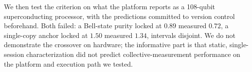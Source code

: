 %
%

We then test the criterion on what the platform reports as a 108-qubit
superconducting processor, with the predictions committed to version
control beforehand. Both failed: a Bell-state purity locked at \(0.89\)
measured \(0.72\), a single-copy anchor locked at \(1.50\) measured
\(1.34\), intervals disjoint. We do not demonstrate the crossover on
hardware; the informative part is that static, single-session
characterization did not predict collective-measurement performance on the
platform and execution path we tested.
